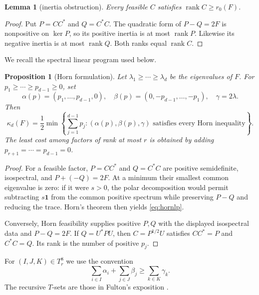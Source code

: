 \documentclass[11pt]{article}
\newtheorem{proposition}[theorem]{Proposition}
\newtheorem{lemma}[theorem]{Lemma}
\newcommand{\rank}{\operatorname{rank}}
\newcommand{\one}{\mathbf 1}
\begin{document}
\begin{lemma}[inertia obstruction]\label{lem:inertia}
Every feasible $C$ satisfies $\rank C\ge r_0(F)$.
\end{lemma}

\begin{proof}
Put $P=CC^*$ and $Q=C^*C$.  The quadratic form of $P-Q=2F$ is
nonpositive on $\ker P$, so its positive inertia is at most $\rank P$.
Likewise its negative inertia is at most $\rank Q$.  Both ranks equal
$\rank C$.
\end{proof}

We recall the spectral linear program used below.

\begin{proposition}[Horn formulation]\label{prop:horn}
Let $\lambda_1\ge\cdots\ge\lambda_d$ be the eigenvalues of $F$.  For
$p_1\ge\cdots\ge p_{d-1}\ge0$, set
\[
 \alpha(p)=(p_1,\ldots,p_{d-1},0),\quad
 \beta(p)=(0,-p_{d-1},\ldots,-p_1),\quad \gamma=2\lambda.
\]
Then
\begin{equation}
 \kappa_d(F)=\frac12\min\left\{\sum_{j=1}^{d-1}p_j:
 (\alpha(p),\beta(p),\gamma)\text{ satisfies every Horn inequality}\right\}.
 \label{eq:hornlp}
\end{equation}
The least cost among factors of rank at most $r$ is obtained by adding
$p_{r+1}=\cdots=p_{d-1}=0$.
\end{proposition}

\begin{proof}
For a feasible factor, $P=CC^*$ and $Q=C^*C$ are positive semidefinite,
isospectral, and $P+(-Q)=2F$.  At a minimum their smallest common eigenvalue
is zero: if it were $s>0$, the polar decomposition would permit subtracting
$s\one$ from the common positive spectrum while preserving $P-Q$ and reducing
the trace.  Horn's theorem \cite{horn1962,klyachko1998,knutson1999,fulton2000}
then yields \eqref{eq:hornlp}.

Conversely, Horn feasibility supplies positive $P,Q$ with the displayed
isospectral data and $P-Q=2F$.  If $Q=U^*PU$, then $C=P^{1/2}U$ satisfies
$CC^*=P$ and $C^*C=Q$.  Its rank is the number of positive $p_j$.
\end{proof}

For $(I,J,K)\in T_r^8$ we use the convention
\begin{equation}
 \sum_{i\in I}\alpha_i+\sum_{j\in J}\beta_j
 \ge \sum_{k\in K}\gamma_k.
 \label{eq:horn}
\end{equation}
The recursive $T$-sets are those in Fulton's exposition \cite{fulton2000}.
\end{document}
